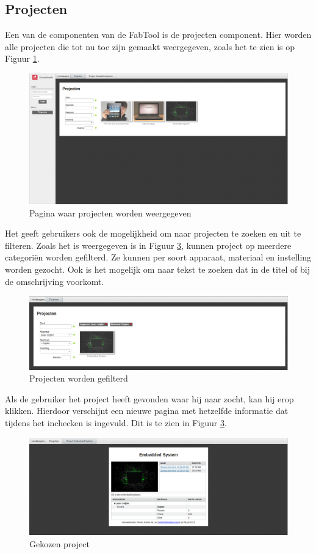 \subsection{Projecten}

Een van de componenten van de FabTool is de projecten component. Hier worden alle projecten die tot nu toe zijn gemaakt weergegeven, zoals het te zien is op Figuur \ref{fig:projects}.

\begin{figure}[Hh]
	\centering
	\includegraphics[width=1\textwidth]{Images/projects.png}
	\caption{Pagina waar projecten worden weergegeven}
	\label{fig:projects}
\end{figure}

Het geeft gebruikers ook de mogelijkheid om naar projecten te zoeken en uit te filteren. Zoals het is weergegeven is in Figuur \ref{fig:filter-projects}, kunnen project op meerdere categori\"en worden gefilterd. Ze kunnen per soort apparaat, materiaal en instelling worden gezocht. Ook is het mogelijk om naar tekst te zoeken dat in de titel of bij de omschrijving voorkomt.

\begin{figure}[Hh]
	\centering
	\includegraphics[width=1\textwidth]{Images/filter-projects.png}
	\caption{Projecten worden gefilterd}
	\label{fig:filter-projects}
\end{figure}

Als de gebruiker het project heeft gevonden waar hij naar zocht, kan hij erop klikken. Hierdoor verschijnt een nieuwe pagina met hetzelfde informatie dat tijdens het inchecken is ingevuld. Dit is te zien in Figuur \ref{fig:filter-projects}.

\begin{figure}[H]
	\centering
	\includegraphics[width=1\textwidth]{Images/project.png}
	\caption{Gekozen project}
	\label{fig:filter-projects}
\end{figure}